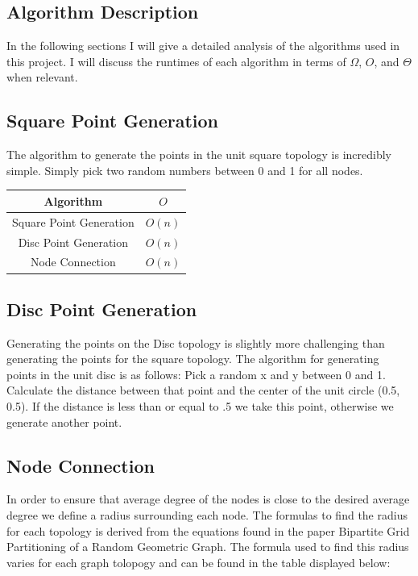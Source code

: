 \documentclass{article}
\begin{document}
	\subsection{Algorithm Description}
		In the following sections I will give a detailed analysis of the algorithms used in this project.
		I will discuss the runtimes of each algorithm in terms of $\Omega$, $O$, and $\Theta$ when relevant.
  \subsection{Square Point Generation}
		The algorithm to generate the points in the unit square topology is incredibly simple.
		Simply pick two random numbers between 0 and 1 for all nodes.

	\begin{center}
		\begin{table}
			\begin{tabular}{ |c|c| }

				\hline
				Algorithm & $O$ \\
				\hline
				Square Point Generation & $O(n)$ \\
				\hline
				Disc Point Generation & $O(n)$ \\
				\hline
				Node Connection & $O(n)$ \\
				\hline
			\end{tabular}
		\end{table}
	\end{center}

  \subsection{Disc Point Generation}
		Generating the points on the Disc topology is slightly more challenging than generating the points for the square topology.
    The algorithm for generating points in the unit disc is as follows:
    Pick a random x and y between 0 and 1.
    Calculate the distance between that point and the center of the unit circle (0.5, 0.5).
    If the distance is less than or equal to .5 we take this point, otherwise we generate another point.

	\subsection{Node Connection}
		In order to ensure that average degree of the nodes is close to the desired average degree we define a radius surrounding each node.
		The formulas to find the radius for each topology is derived from the equations found in the paper Bipartite Grid Partitioning of a Random Geometric Graph\cite{chen2017bipartite}.
		The formula used to find this radius varies for each graph tolopogy and can be found in the table displayed below:
\end{document}
